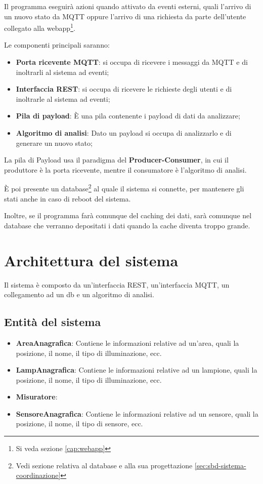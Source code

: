Il programma eseguirà azioni quando attivato da eventi esterni, quali l'arrivo di un nuovo stato da MQTT oppure l'arrivo di una richiesta da parte dell'utente collegato alla webapp\footnote{Si veda sezione \ref{cap:webapp}}.

Le componenti principali saranno:

\begin{itemize}
    \item \textbf{Porta ricevente MQTT}: si occupa di ricevere i messaggi da MQTT e di inoltrarli al sistema ad eventi;
    \item \textbf{Interfaccia REST}: si occupa di ricevere le richieste degli utenti e di inoltrarle al sistema ad eventi;
    \item \textbf{Pila di payload}: È una pila contenente i payload di dati da analizzare;
    \item \textbf{Algoritmo di analisi}: Dato un payload si occupa di analizzarlo e di generare un nuovo stato;
\end{itemize}

La pila di Payload usa il paradigma del \textbf{Producer-Consumer}, in cui il produttore è la porta ricevente, mentre il consumatore è l'algoritmo di analisi.

È poi presente un database\footnote{Vedi sezione relativa al database e alla sua progettazione \ref{sec:sbd-sistema-coordinazione}} al quale il sistema si connette, per mantenere gli stati anche in caso di reboot del sistema.

Inoltre, se il programma farà comunque del caching dei dati, sarà comunque nel database che verranno depositati i dati quando la cache diventa troppo grande.

\section{Architettura del sistema}

Il sistema è composto da un'interfaccia REST, un'interfaccia MQTT, un collegamento ad un db e un algoritmo di analisi.

\subsection{Entità del sistema}

\begin{itemize}
    \item \textbf{AreaAnagrafica}: Contiene le informazioni relative ad un'area, quali la posizione, il nome, il tipo di illuminazione, ecc.
    \item \textbf{LampAnagrafica}: Contiene le informazioni relative ad un lampione, quali la posizione, il nome, il tipo di illuminazione, ecc.
    \item \textbf{Misuratore}:
    \item \textbf{SensoreAnagrafica}: Contiene le informazioni relative ad un sensore, quali la posizione, il nome, il tipo di sensore, ecc.
\end{itemize}

